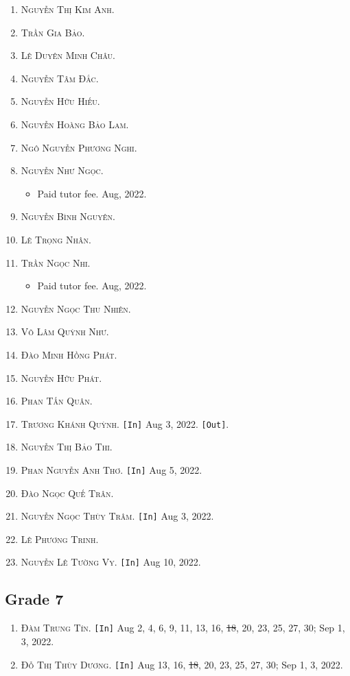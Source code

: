 \documentclass{article}
\numberwithin{equation}{section}
\begin{document}
\begin{enumerate}
	\item \textsc{Nguyễn Thị Kim Anh.}
	\item \textsc{Trần Gia Bảo.}
	\item \textsc{Lê Duyên Minh Châu.}
	\item \textsc{Nguyễn Tâm Đắc.}
	\item \textsc{Nguyễn Hữu Hiếu.}
	\item \textsc{Nguyễn Hoàng Bảo Lam.}
	\item \textsc{Ngô Nguyễn Phương Nghi.}
	\item \textsc{Nguyễn Như Ngọc.}
	\begin{itemize}
		\item \textsf{Paid tutor fee.} Aug, 2022.
	\end{itemize}
	\item \textsc{Nguyễn Bình Nguyên.}
	\item \textsc{Lê Trọng Nhân.}
	\item \textsc{Trần Ngọc Nhi.}
	\begin{itemize}
		\item \textsf{Paid tutor fee.} Aug, 2022.
	\end{itemize}
	\item \textsc{Nguyễn Ngọc Thu Nhiên.}
	\item \textsc{Võ Lâm Quỳnh Như.}
	\item \textsc{Đào Minh Hồng Phát.}
	\item \textsc{Nguyễn Hữu Phát.}
	\item \textsc{Phan Tấn Quân.}
	\item \textsc{Trương Khánh Quỳnh.} \texttt{[In]} Aug 3, 2022. \texttt{[Out]}.
	\item \textsc{Nguyễn Thị Bảo Thi.}
	\item \textsc{Phan Nguyễn Anh Thơ.} \texttt{[In]} Aug 5, 2022.
	\item \textsc{Đào Ngọc Quế Trân.}
	\item \textsc{Nguyễn Ngọc Thùy Trâm.} \texttt{[In]} Aug 3, 2022.
	\item \textsc{Lê Phương Trinh.}
	\item \textsc{Nguyễn Lê Tường Vy.} \texttt{[In]} Aug 10, 2022.
\end{enumerate}

\subsection{Grade 7}
\begin{enumerate}
	\item \textsc{Đàm Trung Tín.} \texttt{[In]} Aug 2, 4, 6, 9, 11, 13, 16, \st{18}, 20, 23, 25, 27, 30; Sep 1, 3, 2022.
	\item \textsc{Đỗ Thị Thùy Dương.} \texttt{[In]} Aug 13, 16, \st{18}, 20, 23, 25, 27, 30; Sep 1, 3, 2022.
\end{enumerate}
\end{document}
